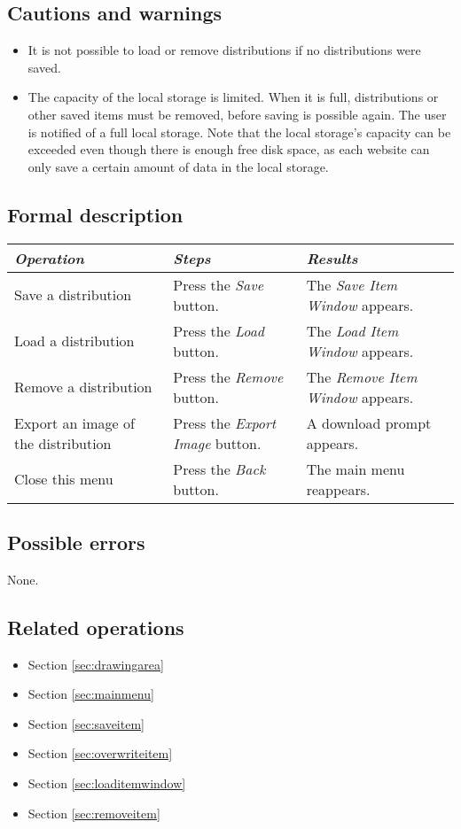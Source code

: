   \subsection*{Cautions and warnings}
  \begin{itemize}
    \item It is not possible to load or remove distributions if no distributions were saved.
    \item The capacity of the local storage is limited. When it is full, distributions or other saved \projectname{} items must be removed, before saving is possible again. The user is notified of a full local storage. Note that the local storage's capacity can be exceeded even though there is enough free disk space, as each website can only save a certain amount of data in the local storage.
  \end{itemize}
  
  \subsection*{Formal description}
  \begin{tabularx}{\textwidth}{XXX}
    \toprule
    \emph{Operation} & \emph{Steps} & \emph{Results} \\
    \midrule
    Save a distribution & Press the \emph{Save} button. & The \emph{Save Item Window} appears. \\
    \midrule
    Load a distribution & Press the \emph{Load} button. & The \emph{Load Item Window} appears. \\
    \midrule
    Remove a distribution & Press the \emph{Remove} button. & The \emph{Remove Item Window} appears. \\
    \midrule
    Export an image of the distribution & Press the \emph{Export Image} button. & A download prompt appears. \\
    \midrule
    Close this menu & Press the \emph{Back} button. & The main menu reappears. \\
    \bottomrule
  \end{tabularx}

  \subsection*{Possible errors}
  None.

  \subsection*{Related operations}
  \begin{itemize}
  \item Section \ref{sec:drawingarea}
    \item Section \ref{sec:mainmenu}
    \item Section \ref{sec:saveitem}
    \item Section \ref{sec:overwriteitem}
    \item Section \ref{sec:loaditemwindow}
    \item Section \ref{sec:removeitem}
  \end{itemize}

